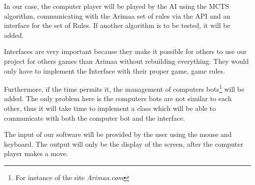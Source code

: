 In our case, the computer player will be played by the AI using the MCTS algorithm, communicating with the Arimaa set of rules via the API and an interface for the set of Rules.  If another algorithm is to be tested, it will be added.

Interfaces are very important because they make it possible for others to use our project for others games than Arimaa without rebuilding everything. They would only have to implement the Interface with their proper game, game rules.

Furthermore, if the time permits it, the management of computers bots\footnote{For instance of the site \textit{Arimaa.com}} will be added. The only problem here is the computers bots are not similar to each other, thus it will take time to implement a class which will be able to communicate with both the computer bot and the interface.

The input of our software will be provided by the user using the mouse and keyboard. The output will only be the display of the screen, after the computer player makes a move.